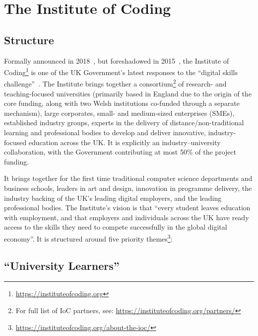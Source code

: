 \documentclass[sigconf,anonymous]{acmart}
\begin{document}
\section{The Institute of Coding}\label{ioc}

\subsection{Structure}

Formally announced in 2018~\cite{DfE2018a}, but foreshadowed in
2015~\cite{HMG2015a}, the Institute of
Coding\footnote{\url{https://instituteofcoding.org}} is one of the UK
Government's latest responses to the ``digital skills
challenge''~\cite{davenport-et-al:cep2019}. The Institute brings
together a consortium\footnote{For full list of IoC partners, see:
\url{https://instituteofcoding.org/partners/}} of research- and
teaching-focused universities (primarily based in England due to the
origin of the core funding, along with two Welsh institutions
co-funded through a separate mechanism), large corporates, small- and
medium-sized enterprises (SMEs), established industry groups, experts
in the delivery of distance/non-traditional learning and professional
bodies to develop and deliver innovative, industry-focused education
across the UK. It is explicitly an industry--university collaboration,
with the Government contributing at most 50\% of the project funding.

It brings together for the first time traditional computer science
departments and business schools, leaders in art and design,
innovation in programme delivery, the industry backing of the UK's
leading digital employers, and the leading professional bodies.  The
Institute's vision is that ``every student leaves education with
employment, and that employers and individuals across the UK have
ready access to the skills they need to compete successfully in the
global digital economy''. It is structured around five priority
themes\footnote{\url{https://instituteofcoding.org/about-the-ioc/}}:

\subsection{``University Learners''}

\end{document}

